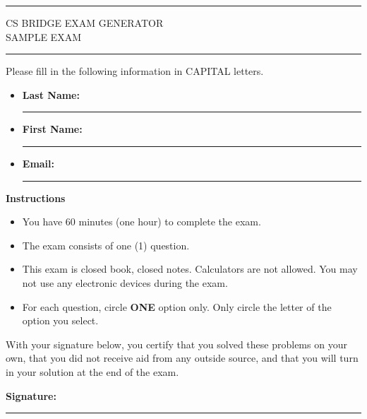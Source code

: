 \thispagestyle{plain}

{\parindent0pt%
\hrule
\vspace{2mm}
CS BRIDGE \hfill EXAM GENERATOR \\
SAMPLE EXAM
\vspace{2mm}
\hrule
\vspace{5mm}
}

Please fill in the following information in CAPITAL letters.

\begin{itemize}
  \item[] \textbf{Last Name:} \rule[-1pt]{3in}{0.4pt}
  \item[] \textbf{First Name:} \rule[-1pt]{3in}{0.4pt}
  \item[] \textbf{Email:} \rule[-1pt]{3in}{0.4pt} 
\end{itemize}

\vspace{5mm}

\begin{infobox}
  \begin{center}
    \textbf{Instructions}
  \end{center}

  \begin{itemize}
    \item You have 60 minutes (one hour) to complete the exam.
    \item The exam consists of one (1) question.
    \item This exam is closed book, closed notes. Calculators are not allowed. You may not use any electronic devices during the exam.
    \item For each question, circle \textbf{ONE} option only. Only circle the letter of the option you select.
  \end{itemize}
\end{infobox}

\vspace{10mm}

{\parindent0pt%
With your signature below, you certify that you solved these problems on your own, that you did not receive aid from any outside source, and that you will turn in your solution at the end of the exam.

\vspace{8mm}

\begin{center}
  \textbf{Signature:} \rule[-1pt]{4in}{0.4pt}
\end{center}
}


\newpage
\restoregeometry
